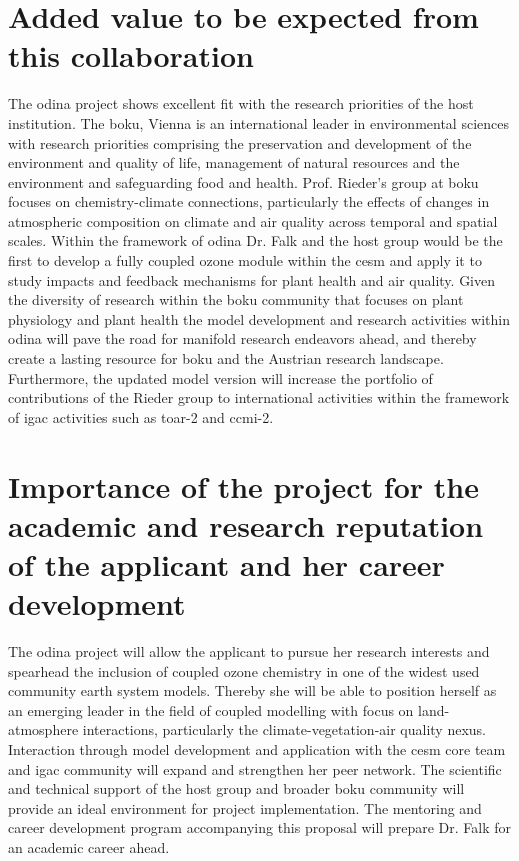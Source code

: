\section{Added value to be expected from this collaboration}
The \gls{odina} project shows excellent fit with the research priorities of the host institution. The \gls{boku}, Vienna is an international leader in environmental sciences with research priorities comprising the preservation and development of the environment and quality of life, management of natural resources and the environment and safeguarding food and health. Prof. Rieder’s group at \gls{boku} focuses on chemistry-climate connections, particularly the effects of changes in atmospheric composition on climate and air quality across temporal and spatial scales. Within the framework of \gls{odina} Dr. Falk and the host group would be the first to develop a fully coupled ozone module within the \gls{cesm} and apply it to study impacts and feedback mechanisms for plant health and air quality. Given the diversity of research within the \gls{boku} community that focuses on plant physiology and plant health the model development and research activities within \gls{odina} will pave the road for manifold research endeavors ahead, and thereby create a lasting resource for \gls{boku} and the Austrian research landscape. Furthermore, the updated model version will increase the portfolio of contributions of the Rieder group to international activities within the framework of \gls{igac} activities such as \gls{toar}-2 and \gls{ccmi}-2.

\section{Importance of the project for the academic and research reputation of the applicant and her career development}
The \gls{odina} project will allow the applicant to pursue her research interests and spearhead the inclusion of coupled ozone chemistry in one of the widest used community earth system models. Thereby she will be able to position herself as an emerging leader in the field of coupled modelling with focus on land-atmosphere interactions, particularly the climate-vegetation-air quality nexus. Interaction through model development and application with the \gls{cesm} core team and \gls{igac} community will expand and strengthen her peer network. The scientific and technical support of the host group and broader \gls{boku} community will provide an ideal environment for project implementation. The mentoring and career development program accompanying this proposal will prepare Dr. Falk for an academic career ahead.

